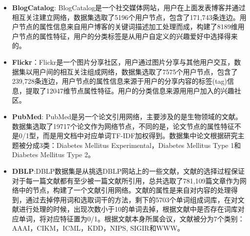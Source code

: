 \begin{itemize}
	\item \textbf{BlogCatalog}: BlogCatalog是一个社交媒体网站，用户在上面发表博客并通过相互关注建立网络，数据集选取了5196个用户节点，包含了171,743条连边。用户节点的属性信息来自用户博客的关键词描述加工处理而成，构建了8189维用户节点的属性特征，用户的分类标签是从用户自定义的兴趣爱好中选择得来的。
	
	\item \textbf{Flickr}：Flickr是一个图片分享社区，用户通过图片分享与其他用户交互，数据集以用户间的相互关注组成网络，数据集选取了7575个用户节点，包含了239,728条连边，用户节点的属性信息来源于用户的分享内容的标签(tag)信息，提取了12047维节点属性特征。用户的分类信息来源用用户加入的兴趣社区。
	
	
	
	\item \textbf{PubMed}: PubMed是另一个论文引用网络，主要涉及的是生物领域的文献。数据集选取了19717个论文作为网络节点，不同的是，论文节点的属性特征不是0/1型，而是用文档中对应单词TF-IDF加权得到。数据集中论文根据研究主题被分成3类：Diabetes Mellitus Experimental，Diabetes Mellitus Type 1和Diabetes Mellitus Type 2。
	
	\item \textbf{DBLP}:DBLP数据集是从挑选DBLP网站上的一些文献，文献的选择过程保证对于每一篇文献都有至少被一篇文献所引用，总共选取了781,109篇文章作为网络中的节点，构建了一个文献引用网络。文献的属性是来自对内容的处理得到，通过去掉停用词和选取词干的方法，剩下的5703个单词组成词库，在对文献进行处理的时候，出现次数小于10的单词去掉，根据文献中是否存在词库对应单词，将对应特征置为0/1。根据文献本身所属会议，文献被分为7个类别：AAAI，CIKM，ICML，KDD，NIPS, SIGIR和WWW。
	
\end{itemize}
